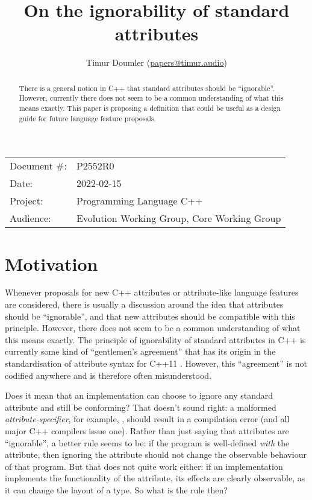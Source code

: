 

\newcommand{\forceindent}{\parindent=1em\indent\parindent=0pt\relax} %


\title{On the ignorability of standard attributes}
\author{
  Timur Doumler \small(\href{mailto:papers@timur.audio}{papers@timur.audio})
}
\date{}
\maketitle

\begin{tabular}{ll}
Document \#: & P2552R0 \\
Date: & 2022-02-15\\
Project: & Programming Language C++ \\
Audience: & Evolution Working Group, Core Working Group
\end{tabular}


\begin{abstract}
There is a general notion in C++ that standard attributes should be ``ignorable''. However, currently there does not seem to be a common understanding of what this means exactly. This paper is proposing a definition that could be useful as a design guide for future language feature proposals.
\end{abstract}


\section{Motivation}
\label{sec:motivation}

Whenever proposals for new C++ attributes or attribute-like language features are considered, there is usually a discussion around the idea that attributes should be ``ignorable'', and that new attributes should be compatible with this principle. However, there does not seem to be a common understanding of what this means exactly. The principle of ignorability of standard attributes in C++ is currently some kind of ``gentlemen's agreement'' that has its origin in the standardisation of attribute syntax for C++11 \cite{N2761}. However, this ``agreement'' is not codified anywhere and is therefore often misunderstood.

Does it mean that an implementation can choose to ignore any standard attribute and still be conforming? That doesn't sound right: a malformed \emph{attribute-specifier}, for example, \tcode{[[fallthrough(42)]]}, should result in a compilation error (and all major C++ compilers issue one). Rather than just saying that attributes are ``ignorable'', a better rule seems to be: if the program is well-defined \emph{with} the attribute, then ignoring the attribute should not change the observable behaviour of that program. But that does not quite work either: if an implementation implements the functionality of the  attribute, its effects are clearly observable, as it can change the layout of a type. So what is the rule then?

